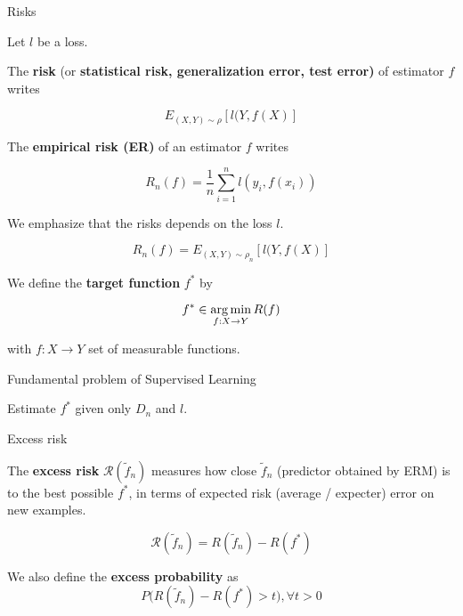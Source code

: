 \documentclass[
10pt, %
a4paper, %
oneside, %
headinclude,footinclude, %
BCOR5mm, %
]{scrartcl}
\begin{document}
\begin{definition}{Risks}

    Let $l$ be a loss.

    The \textbf{{risk}} (or \textbf{{statistical risk, generalization error, test error)}} of estimator $f$ writes

    \begin{equation*}
	E_{(X,Y)\sim \rho}[l(Y,f(X)]
    \end{equation*}

    The \textbf{{empirical risk (ER)}} of an estimator $f$ writes

    \begin{equation*}
	R_n(f) = \frac{1}{n} \sum^{n}_{i=1} l(y_i, f(x_i))
    \end{equation*}

    We emphasize that the risks depends on the loss $l$.
\end{definition}

\begin{remark}

    \begin{equation*}
	R_n(f)=E_{(X,Y)\sim \rho_n}[l(Y,f(X)]
    \end{equation*}
\end{remark}

We define the \textbf{{target function}} $f^*$ by

\begin{equation*}
    f^*\in \operatorname*{arg\,min}_{f:X\rightarrow Y} R(f)
\end{equation*}

with $f:X\rightarrow Y$ set of measurable functions.


\begin{definition}{Fundamental problem of Supervised Learning}

    Estimate $f^*$ given only $D_n$ and $l$.
    
\end{definition}

\begin{definition}{Excess risk}

    The \textbf{{excess risk}} $ \mathcal{R} ( \tilde{f}_n)$ measures how close  $ \tilde{f}_n$ (predictor obtained by ERM) is to the best possible $f^*$, in terms of expected risk (average / expecter) error on new examples.

    \begin{equation*}
	\mathcal{R} ( \tilde{f}_n) = R( \tilde{f}_n)-R(f^*)
    \end{equation*}

    We also define the \textbf{{excess probability}} as
    \begin{equation*}
	P\big( R( \tilde{f}_n)-R(f^*)>t\big), \forall t>0
    \end{equation*}
\end{definition}
\end{document}
